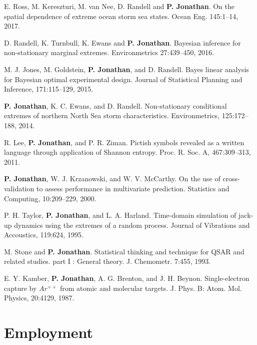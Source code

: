 \documentclass[11pt,a4paper]{moderncv}
\begin{document}
E. Ross, M. Kereszturi, M. van Nee, D. Randell and \textbf{P. Jonathan}. On the spatial dependence of extreme ocean storm sea states. Ocean Eng. 145:1--14, 2017.

D. Randell, K. Turnbull, K. Ewans and \textbf{P. Jonathan}. Bayesian inference for non-stationary marginal extremes. Environmetrics 27:439--450, 2016.

M. J. Jones, M. Goldstein, \textbf{P. Jonathan}, and D. Randell. Bayes linear analysis for Bayesian optimal experimental design. Journal of Statistical Planning and Inference, 171:115--129, 2015.

\textbf{P. Jonathan}, K. C. Ewans, and D. Randell. Non-stationary conditional extremes of northern North Sea storm characteristics. Environmetrics, 125:172--188, 2014.

R. Lee, \textbf{P. Jonathan}, and P. R. Ziman. Pictish symbols revealed as a written language through application of Shannon entropy. Proc. R. Soc. A, 467:309--313, 2011.

\textbf{P. Jonathan}, W. J. Krzanowski, and W. V. McCarthy. On the use of cross-validation to assess performance in multivariate prediction. Statistics and Computing, 10:209--229, 2000.

P. H. Taylor, \textbf{P. Jonathan}, and L. A. Harland. Time-domain simulation of jack-up dynamics using the extremes of a random process. Journal of Vibrations and Accoustics, 119:624, 1995.

M. Stone and \textbf{P. Jonathan}. Statistical thinking and technique for QSAR and related studies. part I : General theory. J. Chemometr. 7:455, 1993.

E. Y. Kamber, \textbf{P. Jonathan}, A. G. Brenton, and J. H. Beynon. Single-electron capture by $Ar^{++}$ from atomic and molecular targets. J. Phys. B: Atom. Mol. Physics, 20:4129, 1987.

\setlength{\parskip}{0.5em}

\section{Employment}
\end{document}
